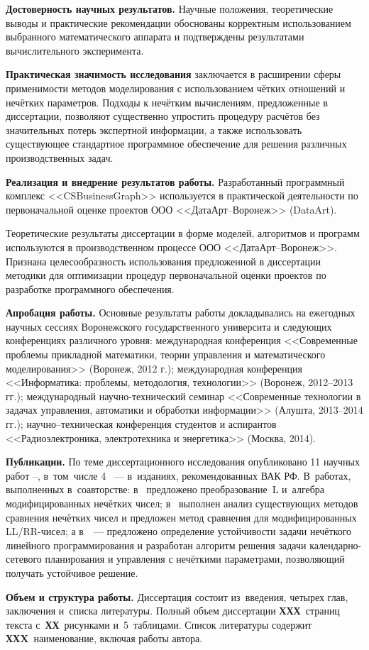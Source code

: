 \textbf{Достоверность научных результатов.} Научные положения, теоретические выводы и практические рекомендации обоснованы корректным использованием выбранного математического аппарата и подтверждены результатами вычислительного эксперимента.

\textbf{Практическая значимость исследования} заключается в расширении сферы применимости методов моделирования с использованием чётких отношений и нечётких параметров. Подходы к нечётким вычислениям, предложенные в диссертации, позволяют существенно упростить процедуру расчётов без значительных потерь экспертной информации, а также использовать существующее стандартное программное обеспечение для решения различных производственных задач.

\textbf{Реализация и внедрение результатов работы.} Разработанный программный комплекс <<CSBusinessGraph>> используется в практической деятельности по первоначальной оценке проектов ООО <<ДатаАрт--Воронеж>> (DataArt).

Теоретические результаты диссертации в форме моделей, алгоритмов и программ используются в производственном процессе ООО <<ДатаАрт--Воронеж>>. Признана целесообразность использования предложенной в диссертации методики для оптимизации процедур первоначальной оценки проектов по разработке программного обеспечения.

\textbf{Апробация работы.} Основные результаты работы докладывались на ежегодных научных сессиях Воронежского государственного университа и следующих конференциях различного уровня: международная конференция <<Современные проблемы прикладной математики, теории управления и математического моделирования>> (Воронеж, 2012 г.); международная конференция <<Информатика: проблемы, методология, технологии>> (Воронеж, 2012--2013 гг.); международный научно-технический семинар <<Современные технологии в задачах управления, автоматики и обработки информации>> (Алушта, 2013--2014 гг.); научно--техническая конференция студентов и аспирантов <<Радиоэлектроника, электротехника и энергетика>> (Москва, 2014).

\textbf{Публикации.} По теме диссертационного исследования опубликовано 11 научных работ \cite{PMTYMM}--\cite{Kanischeva}, в~том~числе 4 \cite{Kanischeva, Vorontsov_Compare, Vorontsov_PI, Vorontsov_VSTU}~--- в~изданиях, рекомендованных ВАК РФ. В~работах, выполненных в~соавторстве: в~\cite{Vorontsov_PI} предложено преобразование~L и~алгебра модифицированных нечётких чисел; в~\cite{Vorontsov_Compare} выполнен анализ существующих методов сравнения нечётких чисел и предложен метод сравнения для модифицированных LL/RR-чисел; а в~\cite{Vorontsov_VSTU}~--- предложено определение устойчивости задачи нечёткого линейного программирования и разработан алгоритм решения задачи календарно-сетевого планирования и управления с нечёткими параметрами, позволяющий получать устойчивое решение.

\textbf{Объем и структура работы.} Диссертация состоит из~введения, четырех глав, заключения и~списка литературы. Полный объем диссертации \textbf{ХХХ}~страниц текста с~\textbf{ХХ}~рисунками и~5~таблицами. Список литературы содержит \textbf{ХХX}~наименование, включая работы автора.